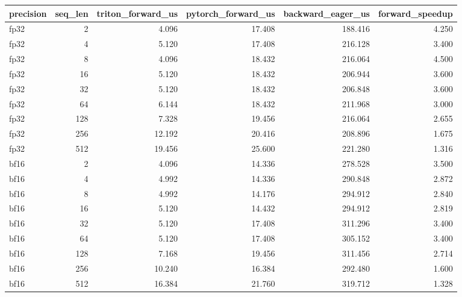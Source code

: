 \begin{tabular}{lrrrrr}
\toprule
precision & seq\_len & triton\_forward\_us & pytorch\_forward\_us & backward\_eager\_us & forward\_speedup \\
\midrule
fp32 & 2 & 4.096 & 17.408 & 188.416 & 4.250 \\
fp32 & 4 & 5.120 & 17.408 & 216.128 & 3.400 \\
fp32 & 8 & 4.096 & 18.432 & 216.064 & 4.500 \\
fp32 & 16 & 5.120 & 18.432 & 206.944 & 3.600 \\
fp32 & 32 & 5.120 & 18.432 & 206.848 & 3.600 \\
fp32 & 64 & 6.144 & 18.432 & 211.968 & 3.000 \\
fp32 & 128 & 7.328 & 19.456 & 216.064 & 2.655 \\
fp32 & 256 & 12.192 & 20.416 & 208.896 & 1.675 \\
fp32 & 512 & 19.456 & 25.600 & 221.280 & 1.316 \\
bf16 & 2 & 4.096 & 14.336 & 278.528 & 3.500 \\
bf16 & 4 & 4.992 & 14.336 & 290.848 & 2.872 \\
bf16 & 8 & 4.992 & 14.176 & 294.912 & 2.840 \\
bf16 & 16 & 5.120 & 14.432 & 294.912 & 2.819 \\
bf16 & 32 & 5.120 & 17.408 & 311.296 & 3.400 \\
bf16 & 64 & 5.120 & 17.408 & 305.152 & 3.400 \\
bf16 & 128 & 7.168 & 19.456 & 311.456 & 2.714 \\
bf16 & 256 & 10.240 & 16.384 & 292.480 & 1.600 \\
bf16 & 512 & 16.384 & 21.760 & 319.712 & 1.328 \\
\bottomrule
\end{tabular}
